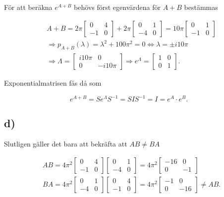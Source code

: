 \documentclass[a4paper]{article}
\newcommand{\mat}[1]{\bm{\mathit{#1}}}
\begin{document}
\noindent För att beräkna $e^{\mat{A} + \mat{B}}$ behövs först egenvärdena för
$\mat{A} + \mat{B}$ bestämmas

\begin{align*}
  &\mat{A} + \mat{B} = 2\pi\begin{bmatrix}0 & 4\\-1 & 0\end{bmatrix} + 2\pi\begin{bmatrix}0 & 1\\-4 & 0\end{bmatrix} = 10\pi\begin{bmatrix}0 & 1\\-1 & 0\end{bmatrix}\\[2ex]
  &\Rightarrow p_{A+B}(\lambda) = \lambda^2 + 100\pi^2 = 0 \iff \lambda = \pm i10\pi\\[2ex]
  &\Rightarrow \mat{\Lambda} = \begin{bmatrix}i10\pi & 0\\0 & -i10\pi\end{bmatrix} \Rightarrow e^{\mat{\Lambda}} = \begin{bmatrix}1 & 0\\0 & 1\end{bmatrix}.
\end{align*}

\noindent Exponentialmatrisen fås då som

\begin{equation*}
  e^{\mat{A}+\mat{B}} = \mat{S}e^{\mat{\Lambda}}\mat{S}^{-1} = \mat{SIS}^{-1} = \mat{I} = e^{\mat{A}}\cdot e^{\mat{B}}.
\end{equation*}

\subsection*{d)}

Slutligen gäller det bara att bekräfta att $\mat{AB} \neq \mat{BA}$

\begin{align*}
  &\mat{AB} = 4\pi^2\begin{bmatrix}0 & 4\\-1 & 0\end{bmatrix}\begin{bmatrix}0 & 1\\-4 & 0\end{bmatrix} = 4\pi^2\begin{bmatrix}-16 & 0\\0 & -1\end{bmatrix}\\[2ex]
  &\mat{BA} = 4\pi^2\begin{bmatrix}0 & 1\\-4 & 0\end{bmatrix}\begin{bmatrix}0 & 4\\-1 & 0\end{bmatrix} = 4\pi^2\begin{bmatrix}-1 & 0\\0 & -16\end{bmatrix} \neq \mat{AB}.
\end{align*}
\end{document}
